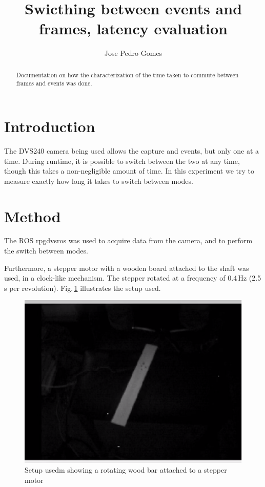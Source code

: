 \documentclass[10pt,twocolumn]{IEEEtran}
\begin{document}
\title{Swicthing between events and frames, latency evaluation}
\author{Jose Pedro Gomes}

\maketitle

\begin{abstract}
    Documentation on how the characterization of the time taken to commute between frames and events was done.
\end{abstract}

\section{Introduction}

The DVS240 camera being used allows the capture and events, but only one at a time. During runtime, it is possible to switch between the two at any time, though this takes a non-negligible amount of time. In this experiment we try to measure exactly how long it takes to switch between modes.


\section{Method}

The ROS rpg\textunderscore dvs\textunderscore ros was used to acquire data from the camera, and to perform the switch between modes.

Furthermore, a stepper motor with a wooden board attached to the shaft was used, in a clock-like mechanism. The stepper rotated at a frequency of 0.4\,Hz (2.5\,s per revolution). Fig.\,\ref{fig:w11_setup} illustrates the setup used.

\begin{figure}[ht]
    \centering
    \includegraphics[width = 0.8\linewidth]{setup.png}
    \caption{Setup usedm showing a rotating wood bar attached to a stepper motor}
    \label{fig:w11_setup}
\end{figure}
\end{document}
